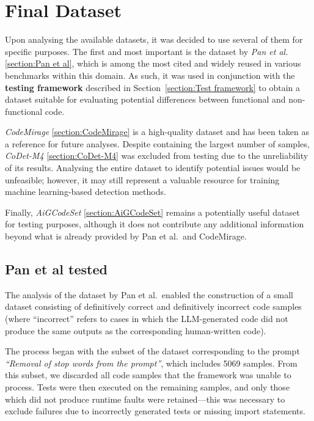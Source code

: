 \clearpage
\section{Final Dataset}
Upon analysing the available datasets, it was 
decided to use several of them for specific purposes. 
The first and most important is the dataset by \textit{Pan et al.}
\ref{section:Pan et al}, 
which is among the most cited and widely reused in various 
benchmarks within this domain. As such, it was used in 
conjunction with the \textbf{testing framework} described in 
Section~\ref{section:Test framework} to obtain a dataset 
suitable for evaluating potential differences between 
functional and non-functional code.

\textit{CodeMirage} \ref{section:CodeMirage} is a 
high-quality dataset and has 
been taken as a reference for future analyses. Despite 
containing the largest number of samples, 
\textit{CoDet-M4} \ref{section:CoDet-M4} 
was excluded from testing due to the unreliability of its 
results. Analysing the entire dataset to identify potential 
issues would be unfeasible; however, it may still represent 
a valuable resource for training machine learning-based 
detection methods.

Finally, \textit{AiGCodeSet} \ref{section:AiGCodeSet} 
remains a potentially useful 
dataset for testing purposes, although it does not contribute 
any additional information beyond what is already provided 
by Pan et al.\ and CodeMirage.

\subsection{Pan et al tested}
The analysis of the dataset by Pan et al.\ 
enabled the construction of a small dataset 
consisting of definitively correct and definitively 
incorrect code samples (where “incorrect” refers to 
cases in which the LLM-generated code did not produce 
the same outputs as the corresponding human-written code).

The process began with the subset of the dataset 
corresponding to the prompt \textit{“Removal of 
stop words from the prompt”}, which includes 5069 
samples. From this subset, we discarded all code 
samples that the framework was unable to process. 
Tests were then executed on the remaining samples, 
and only those which did not produce runtime faults 
were retained—this was necessary to exclude failures 
due to incorrectly generated tests or missing import 
statements.

